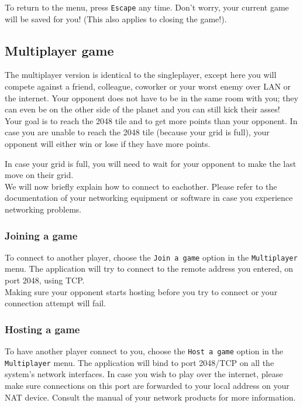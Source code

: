 \documentclass[a4paper,11pt,report]{scrartcl}
\begin{document}
To return to the menu, press \texttt{Escape} any time. Don't worry,
your current game will be saved for you! (This also applies to closing the
game!).

\subsection{Multiplayer game}
The multiplayer version is identical to the singleplayer, except here you will
compete against a friend, colleague, coworker or your worst enemy over LAN or
the internet. Your opponent does not have to be in the same room with you; they
can even be on the other side of the planet and you can still kick their
asses!\\

Your goal is to reach the 2048 tile and to get more points than your opponent.  In case you
are unable to reach the 2048 tile (because your grid is full), your opponent will either win or lose if they have more points. 

In case your grid is full, you will need to wait for your opponent to make the last move on their grid.\\

We will now briefly explain how to connect to eachother. Please refer to the
documentation of your networking equipment or software in case you experience
networking problems.

\subsubsection{Joining a game}
To connect to another player, choose the \texttt{Join a game} option in the
\texttt{Multiplayer} menu. The application will try to connect to the remote address you
entered, on port 2048, using TCP.\\
Making sure your opponent starts hosting before you try to connect or your connection attempt will fail.

\subsubsection{Hosting a game}
To have another player connect to you, choose the \texttt{Host a game} option
in the \texttt{Multiplayer} menu. The application will bind to port 2048/TCP on all the
system's network interfaces. In case you wish to play over the internet,
please make sure connections on this port are forwarded to your local address
on your NAT device. Consult the manual of your network products for more 
information.
\end{document}

